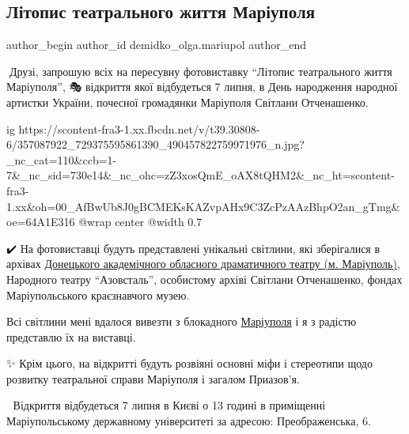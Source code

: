  
 
 
 
 

\subsection{Літопис театрального життя Маріуполя}
\label{sec:29_06_2023.fb.demidko_olga.mariupol.2.litopys_teatralnogo_zhyttja_mariupolja}

\ifcmt
 author_begin
   author_id demidko_olga.mariupol
 author_end
\fi

📎Друзі, запрошую всіх на пересувну фотовиставку \enquote{Літопис театрального життя
Маріуполя}, 🎭 відкриття якої відбудеться 7 липня, в День народження народної
артистки України, почесної громадянки Маріуполя Світлани Отченашенко.

\ifcmt
  ig https://scontent-fra3-1.xx.fbcdn.net/v/t39.30808-6/357087922_729375595861390_490457822759971976_n.jpg?_nc_cat=110&ccb=1-7&_nc_sid=730e14&_nc_ohc=zZ3xosQmE_oAX8tQHM2&_nc_ht=scontent-fra3-1.xx&oh=00_AfBwUb8J0gBCMEKsKAZvpAHx9C3ZcPzAAzBhpO2an_gTmg&oe=64A1E316
  @wrap center
  @width 0.7
\fi

✔️ На фотовиставці будуть представлені унікальні світлини, які зберігалися в
архівах \href{\urlMariupolDramTeatrIA}{Донецького академічного обласного драматичного театру (м. Маріуполь)},
Народного театру \enquote{Азовсталь}, особистому архіві Світлани Отченашенко, фондах
Маріупольського краєзнавчого музею.

Всі світлини мені вдалося вивезти з блокадного \href{\urlMariupolIA}{Маріуполя} і я з радістю
представлю їх на виставці. 

✨️ Крім цього, на відкритті будуть розвіяні основні міфи і стереотипи щодо
розвитку театральної справи Маріуполя і загалом Приазов'я.

🏤 Відкриття відбудеться 7 липня в Києві о 13 годині в приміщенні
Маріупольському державному університеті за адресою: Преображенська, 6.
